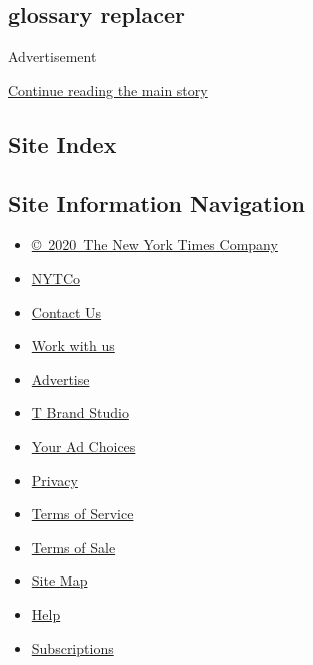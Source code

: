 \hypertarget{glossary-replacer}{%
\subsection{glossary replacer}\label{glossary-replacer}}

Advertisement

\protect\hyperlink{after-bottom}{Continue reading the main story}

\hypertarget{site-index}{%
\subsection{Site Index}\label{site-index}}

\hypertarget{site-information-navigation}{%
\subsection{Site Information
Navigation}\label{site-information-navigation}}

\begin{itemize}
\tightlist
\item
  \href{https://help.nytimes.com/hc/en-us/articles/115014792127-Copyright-notice}{©~2020~The
  New York Times Company}
\end{itemize}

\begin{itemize}
\tightlist
\item
  \href{https://www.nytco.com/}{NYTCo}
\item
  \href{https://help.nytimes.com/hc/en-us/articles/115015385887-Contact-Us}{Contact
  Us}
\item
  \href{https://www.nytco.com/careers/}{Work with us}
\item
  \href{https://nytmediakit.com/}{Advertise}
\item
  \href{http://www.tbrandstudio.com/}{T Brand Studio}
\item
  \href{https://www.nytimes.com/privacy/cookie-policy\#how-do-i-manage-trackers}{Your
  Ad Choices}
\item
  \href{https://www.nytimes.com/privacy}{Privacy}
\item
  \href{https://help.nytimes.com/hc/en-us/articles/115014893428-Terms-of-service}{Terms
  of Service}
\item
  \href{https://help.nytimes.com/hc/en-us/articles/115014893968-Terms-of-sale}{Terms
  of Sale}
\item
  \href{https://spiderbites.nytimes.com}{Site Map}
\item
  \href{https://help.nytimes.com/hc/en-us}{Help}
\item
  \href{https://www.nytimes.com/subscription?campaignId=37WXW}{Subscriptions}
\end{itemize}
